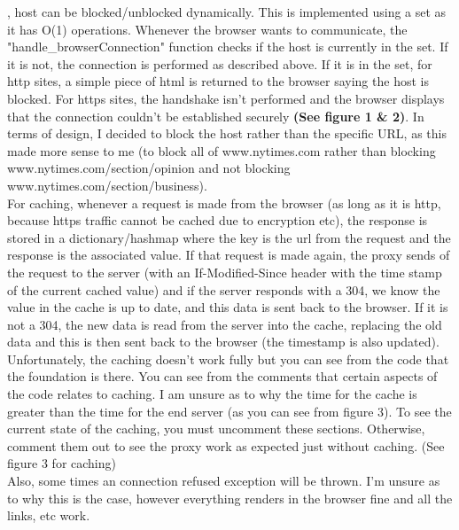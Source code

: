 \documentclass{report}
\begin{document}
    , host can be blocked/unblocked dynamically. This is implemented using a set as it has O(1)
    operations. Whenever the browser wants to communicate, the "handle\_browserConnection" function checks if the host is currently in the set. If it is not, the connection is performed
    as described above. If it is in the set, for http sites, a simple piece of html is returned to the browser saying the host is blocked. For https sites, the handshake isn't performed
    and the browser displays that the connection couldn't be established securely \textbf{(See figure 1 \& 2)}. In terms of design, I decided to block the host rather than the 
    specific URL, as this made more sense to me (to block all of www.nytimes.com rather than blocking www.nytimes.com/section/opinion and not blocking www.nytimes.com/section/business).\\

    
    For caching, whenever a request is made from the browser (as long as it is http, because https traffic cannot be cached due to encryption etc), the response is stored in a dictionary/hashmap where the key
    is the url from the request and the response is the associated value. If that request is made again, the proxy sends of the request to the server (with an If-Modified-Since header
    with the time stamp of the current cached value) and if the server responds with a 
    304, we know the value in the cache is up to date, and this data is sent back to the browser. If it is not a 304, the new data is read from the server into the cache, replacing the 
    old data and this is then sent back to the browser (the timestamp is also updated).\\

    Unfortunately, the caching doesn't work fully but you can see from the code that the foundation is there. You can see from the comments that certain aspects of the code 
    relates to caching. I am unsure as to why the time for the cache is greater than the time for the end server (as you can see from figure 3). To see the current state of the caching, you must uncomment these sections. Otherwise, comment them out to see the proxy work as expected just without caching.
    (See figure 3 for caching)\\
    Also, some times an connection refused exception will be thrown. I'm unsure as to why this is the case, however everything renders in the browser fine and all the links, etc work.\\\\
\end{document}
